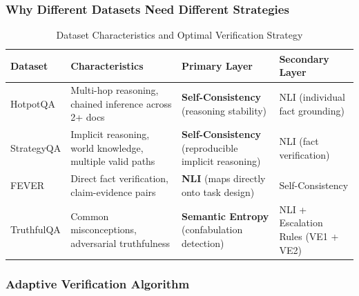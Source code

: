 \documentclass[12pt,a4paper]{article}
\theoremstyle{definition}
\begin{document}
\subsubsection{Why Different Datasets Need Different Strategies}

\begin{table}[htbp]
\centering
\caption{Dataset Characteristics and Optimal Verification Strategy}
\small
\begin{tabular}{lp{3.5cm}p{3cm}p{3cm}}
\toprule
\textbf{Dataset} & \textbf{Characteristics} & \textbf{Primary Layer} & \textbf{Secondary Layer} \\
\midrule
HotpotQA & Multi-hop reasoning, chained inference across 2+ docs & \textbf{Self-Consistency} (reasoning stability) & NLI (individual fact grounding) \\
\midrule
StrategyQA & Implicit reasoning, world knowledge, multiple valid paths & \textbf{Self-Consistency} (reproducible implicit reasoning) & NLI (fact verification) \\
\midrule
FEVER & Direct fact verification, claim-evidence pairs & \textbf{NLI} (maps directly onto task design) & Self-Consistency \\
\midrule
TruthfulQA & Common misconceptions, adversarial truthfulness & \textbf{Semantic Entropy} (confabulation detection) & NLI + Escalation Rules (VE1 + VE2) \\
\bottomrule
\end{tabular}
\end{table}

\subsubsection{Adaptive Verification Algorithm}
\end{document}
